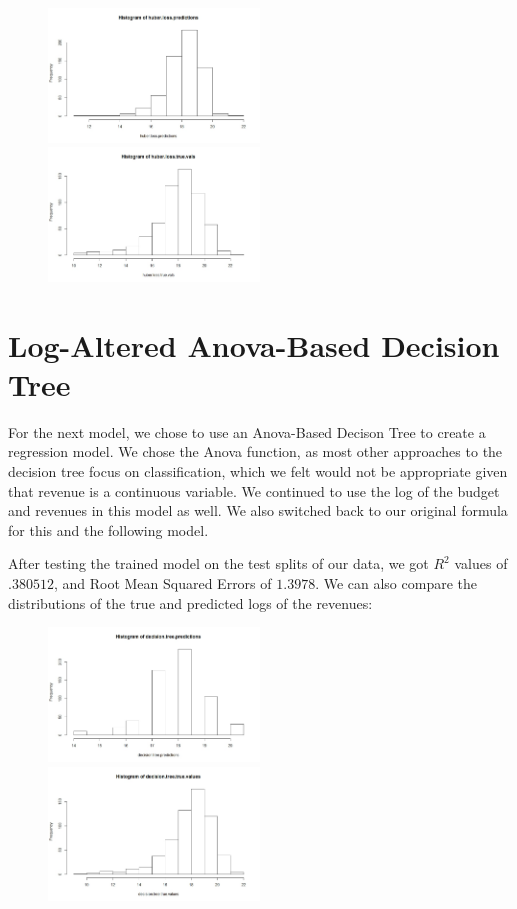\documentclass{article}
\begin{document}
\begin{figure}[ht]
\includegraphics[width = 0.5\textwidth]{hlp.jpeg}
\includegraphics[width = 0.5\textwidth]{hltv.jpeg}
\end{figure}


\section*{Log-Altered Anova-Based Decision Tree}
\vspace{0.2in}

For the next model, we chose to use an Anova-Based Decison Tree to create a regression model.  We chose the Anova function, as most other approaches to the decision tree focus on classification, which we felt would not be appropriate given that revenue is a continuous variable.  We continued  to use the log of the budget and revenues in this model as well. We also switched back to our original formula for this and the following model.

After testing the trained model on the test splits of our data, we got $R^2$ values of $.380512$, and Root Mean Squared Errors of $1.3978$.  We can also compare the distributions of the true and predicted logs of the revenues:

\begin{figure}[h]
\includegraphics[width = 0.5\textwidth]{dtp.jpeg}
\includegraphics[width = 0.5\textwidth]{dttv.jpeg}
\end{figure}
\end{document}
